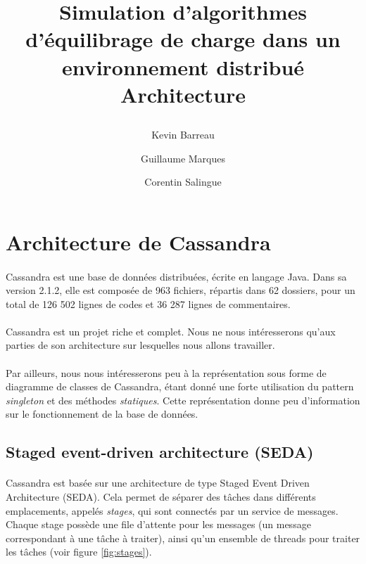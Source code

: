 \documentclass[12pt]{article}
\title{
 \begin{minipage}\linewidth
        \centering
        Simulation d'algorithmes d'équilibrage de charge dans un environnement distribué 
        \vskip3pt
        \large Architecture
    \end{minipage}
 }
\author{Kevin Barreau \and Guillaume Marques \and Corentin Salingue}
\begin{document}
\maketitle

\newpage

\renewcommand{\contentsname}{Sommaire} 
\tableofcontents

\newpage

\section{Architecture de Cassandra}

\paragraph{} Cassandra est une base de données distribuées, écrite en langage Java. Dans sa version 2.1.2, elle est composée de 963 fichiers, répartis dans 62 dossiers, pour un total de 126 502 lignes de codes et 36 287 lignes de commentaires.

\paragraph{} Cassandra est un projet riche et complet. Nous ne nous intéresserons qu'aux parties de son architecture sur lesquelles nous allons travailler.

\paragraph{} Par ailleurs, nous nous intéresserons peu à la représentation sous forme de diagramme de classes de Cassandra, étant donné une forte utilisation du pattern \textit{singleton} et des méthodes \textit{statiques}. Cette représentation donne peu d'information sur le fonctionnement de la base de données.

\subsection{Staged event-driven architecture (SEDA)}

\paragraph{} Cassandra est basée sur une architecture de type Staged Event Driven Architecture (SEDA). Cela permet de séparer des tâches dans différents emplacements, appelés \textit{stages}, qui sont connectés par un service de messages. Chaque stage possède une file d'attente pour les messages (un message correspondant à une tâche à traiter), ainsi qu'un ensemble de threads pour traiter les tâches (voir figure \ref{fig:stages}).
\end{document}
